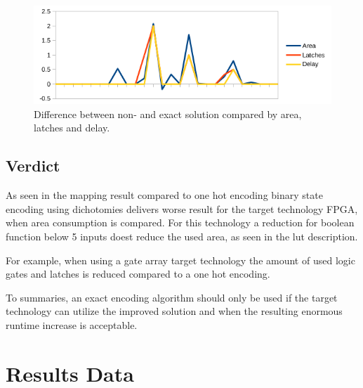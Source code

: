 \begin{figure}[H]
	\centering
	\includegraphics{graphics/diff.png}
	\caption{Difference between non- and exact solution compared by area, latches and delay.}
	\label{fig:diff}
\end{figure}

\section{Verdict}
As seen in the mapping result compared to one hot encoding binary state encoding using dichotomies delivers worse result for the target technology FPGA, when area consumption is compared. For this technology a reduction for boolean function below 5 inputs doest reduce the used area, as seen in the lut description.


For example, when using a gate array target technology the amount of used logic gates and latches is reduced compared to a one hot encoding. 

To summaries, an exact encoding algorithm should only be used if the target technology can utilize the improved solution and when the resulting enormous runtime increase is acceptable. 

\chapter*{Results Data}

